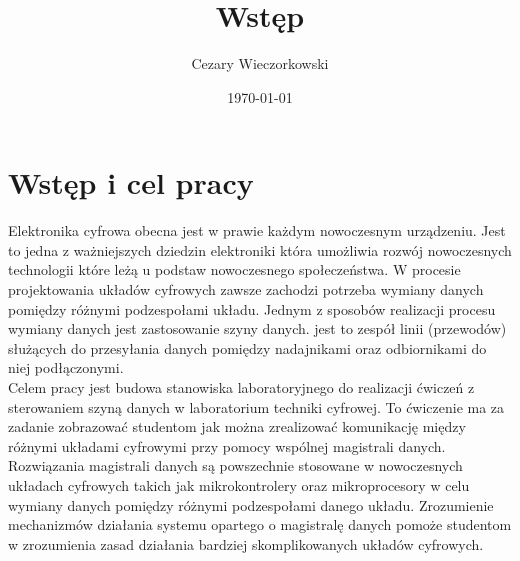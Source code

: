 \documentclass[../main.tex]{subfiles}
\author{Cezary Wieczorkowski}
\date{\today}
\title{Wstęp}
\begin{document}
\section{Wstęp i cel pracy}

Elektronika cyfrowa obecna jest w prawie każdym nowoczesnym urządzeniu. Jest to jedna z ważniejszych dziedzin elektroniki 
która umożliwia rozwój nowoczesnych technologii które leżą u podstaw nowoczesnego społeczeństwa. W procesie projektowania układów cyfrowych
zawsze zachodzi potrzeba wymiany danych pomiędzy różnymi podzespołami układu. Jednym z sposobów realizacji procesu wymiany danych jest zastosowanie
szyny danych. jest to zespół linii (przewodów) służących do przesyłania danych pomiędzy nadajnikami oraz odbiornikami do niej podłączonymi. 
\\  
Celem pracy jest budowa stanowiska laboratoryjnego do realizacji ćwiczeń z sterowaniem szyną danych w laboratorium techniki cyfrowej.
To ćwiczenie ma za zadanie zobrazować studentom jak można zrealizować komunikację między różnymi układami cyfrowymi przy pomocy
wspólnej magistrali danych. Rozwiązania magistrali danych są powszechnie stosowane w nowoczesnych układach cyfrowych takich jak mikrokontrolery oraz
mikroprocesory w celu wymiany danych pomiędzy różnymi podzespołami danego układu. Zrozumienie mechanizmów działania systemu opartego o 
magistralę danych pomoże studentom w zrozumienia zasad działania bardziej skomplikowanych układów cyfrowych.
\end{document}

